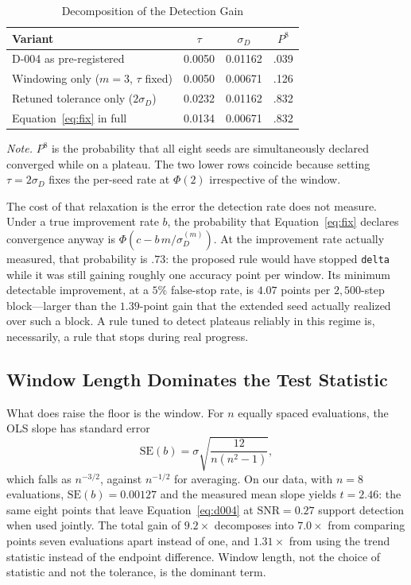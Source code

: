 \documentclass[jou,11pt,donotrepeattitle]{apa7}
\begin{document}
\begin{table}[htbp]
\caption{Decomposition of the Detection Gain}
\label{tab:desc}
\begin{tabular}{lccc}
\toprule
Variant & $\tau$ & $\sigma_D$ & $P^{8}$ \\
\midrule
D-004 as pre-registered              & 0.0050 & 0.01162 & .039 \\
Windowing only ($m = 3$, $\tau$ fixed) & 0.0050 & 0.00671 & .126 \\
Retuned tolerance only ($2\sigma_D$) & 0.0232 & 0.01162 & .832 \\
Equation~\ref{eq:fix} in full        & 0.0134 & 0.00671 & .832 \\
\bottomrule
\end{tabular}

\vspace{5pt}
{\small\raggedright \textit{Note.} $P^{8}$ is the probability that all eight seeds are simultaneously
declared converged while on a plateau. The two lower rows coincide because setting
$\tau = 2\sigma_D$ fixes the per-seed rate at $\Phi(2)$ irrespective of the window.
\par}
\end{table}

The cost of that relaxation is the error the detection rate does not measure. Under a true
improvement rate $b$, the probability that Equation~\ref{eq:fix} declares convergence anyway is
$\Phi\!\left(c - b\,m/\sigma_D^{(m)}\right)$. At the improvement rate actually measured, that
probability is $.73$: the proposed rule would have stopped \texttt{delta} while it was still
gaining roughly one accuracy point per window. Its minimum detectable improvement, at a $5\%$
false-stop rate, is $4.07$ points per $2{,}500$-step block---larger than the $1.39$-point gain
that the extended seed actually realized over such a block. A rule tuned to detect plateaus
reliably in this regime is, necessarily, a rule that stops during real progress.

\subsection{Window Length Dominates the Test Statistic}

What does raise the floor is the window. For $n$ equally spaced evaluations, the OLS slope has
standard error
%
\begin{equation}
\mathrm{SE}(b) = \sigma \sqrt{\frac{12}{n(n^{2}-1)}} ,
\label{eq:se}
\end{equation}
%
which falls as $n^{-3/2}$, against $n^{-1/2}$ for averaging. On our data, with $n = 8$
evaluations, $\mathrm{SE}(b) = 0.00127$ and the measured mean slope yields $t = 2.46$: the same
eight points that leave Equation~\ref{eq:d004} at $\mathrm{SNR} = 0.27$ support detection when
used jointly. The total gain of $9.2\times$ decomposes into $7.0\times$ from comparing points
seven evaluations apart instead of one, and $1.31\times$ from using the trend statistic instead
of the endpoint difference. Window length, not the choice of statistic and not the tolerance, is
the dominant term.
\end{document}
